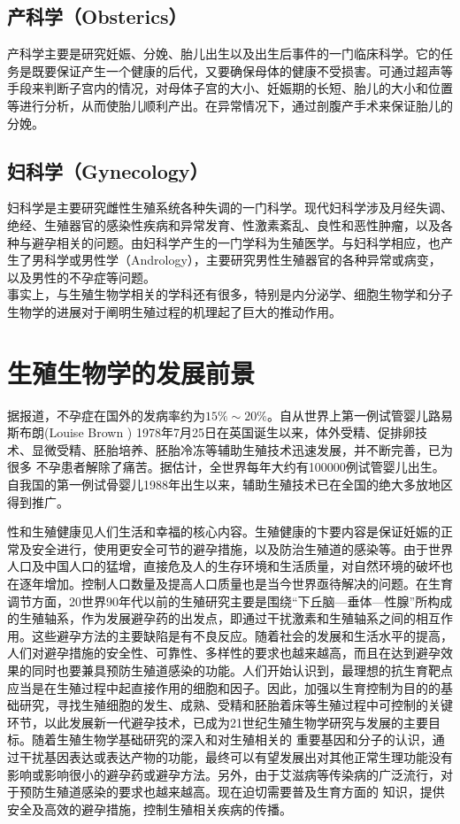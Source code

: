 \subsection{产科学（Obsterics）}

产科学主要是研究妊娠、分娩、胎儿出生以及出生后事件的一门临床科学。它的任务是既要保证产生一个健康的后代，又要确保母体的健康不受损害。可通过超声等手段来判断子宫内的情况，对母体子宫的大小、妊娠期的长短、胎儿的大小和位置等进行分析，从而使胎儿顺利产出。在异常情况下，通过剖腹产手术来保证胎儿的分娩。

\subsection{妇科学（Gynecology）}

妇科学是主要研究雌性生殖系统各种失调的一门科学。现代妇科学涉及月经失调、绝经、生殖器官的感染性疾病和异常发育、性激素紊乱、良性和恶性肿瘤，以及各种与避孕相关的问题。由妇科学产生的一门学科为生殖医学。与妇科学相应，也产生了男科学或男性学（Andrology），主要研究男性生殖器官的各种异常或病变，以及男性的不孕症等问题。\\

事实上，与生殖生物学相关的学科还有很多，特别是内分泌学、细胞生物学和分子生物学的进展对于阐明生殖过程的机理起了巨大的推动作用。

\section{生殖生物学的发展前景}

据报道，不孕症在国外的发病率约为$ 15\%\sim20\% $。自从世界上第一例试管婴儿路易斯布朗(Louise Brown ) 1978年7月25日在英国诞生以来，体外受精、促排卵技 术、显微受精、胚胎培养、胚胎冷冻等辅助生殖技术迅速发展，并不断完善，已为很多 不孕患者解除了痛苦。据估计，全世界每年大约有100000例试管婴儿出生。自我国的第一例试骨婴儿1988年出生以来，辅助生殖技术已在全国的绝大多放地区得到推广。

性和生殖健康见人们生活和幸福的核心内容。生殖健康的卞要内容是保证妊娠的正 常及安全进行，使用更安全可节的避孕措施，以及防治生殖道的感染等。由于世界人口及中国人口的猛增，直接危及人的生存环境和生活质量，对自然环境的破坏也在逐年增加。控制人口数量及提高人口质量也是当今世界亟待解决的问题。在生育调节方面，20世界90年代以前的生殖研究主要是围绕“下丘脑---垂体---性腺”所构成的生殖轴系，作为发展避孕药的出发点，即通过干扰激素和生殖轴系之间的相互作用。这些避孕方法的主要缺陷是有不良反应。随着社会的发展和生活水平的提高，人们对避孕措施的安全性、可靠性、多样性的要求也越来越高，而且在达到避孕效果的同时也要兼具预防生殖道感染的功能。人们开始认识到，最理想的抗生育靶点应当是在生殖过程中起直接作用的细胞和因子。因此，加强以生育控制为目的的基础研究，寻找生殖细胞的发生、成熟、受精和胚胎着床等生殖过程中可控制的关键环节，以此发展新一代避孕技术，已成为21世纪生殖生物学研究与发展的主要目标。随着生殖生物学基础研究的深入和对生殖相关的 重要基因和分子的认识，通过干扰基因表达或表达产物的功能，最终可以有望发展出对其他正常生理功能没有影响或影响很小的避孕药或避孕方法。另外，由于艾滋病等传染病的广泛流行，对于预防生殖道感染的要求也越来越高。现在迫切需要普及生育方面的 知识，提供安全及高效的避孕措施，控制生殖相关疾病的传播。

